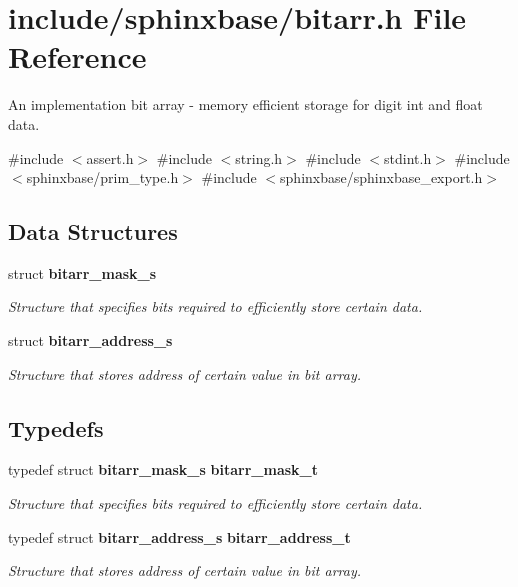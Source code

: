 \section{include/sphinxbase/bitarr.h File Reference}
\label{bitarr_8h}


An implementation bit array -\/ memory efficient storage for digit int and float data.  


{\ttfamily \#include $<$assert.\+h$>$}\newline
{\ttfamily \#include $<$string.\+h$>$}\newline
{\ttfamily \#include $<$stdint.\+h$>$}\newline
{\ttfamily \#include $<$sphinxbase/prim\+\_\+type.\+h$>$}\newline
{\ttfamily \#include $<$sphinxbase/sphinxbase\+\_\+export.\+h$>$}\newline
\subsection*{Data Structures}
\begin{DoxyCompactItemize}
\item 
struct \textbf{ bitarr\+\_\+mask\+\_\+s}
\begin{DoxyCompactList}\small\item\em Structure that specifies bits required to efficiently store certain data. \end{DoxyCompactList}\item 
struct \textbf{ bitarr\+\_\+address\+\_\+s}
\begin{DoxyCompactList}\small\item\em Structure that stores address of certain value in bit array. \end{DoxyCompactList}\end{DoxyCompactItemize}
\subsection*{Typedefs}
\begin{DoxyCompactItemize}
\item 
\mbox{\label{bitarr_8h_abcb7d3674c4b4bbed7af00ddfc07a11f}} 
typedef struct \textbf{ bitarr\+\_\+mask\+\_\+s} \textbf{ bitarr\+\_\+mask\+\_\+t}
\begin{DoxyCompactList}\small\item\em Structure that specifies bits required to efficiently store certain data. \end{DoxyCompactList}\item 
\mbox{\label{bitarr_8h_a0ec20752a791dac325045da770b3510d}} 
typedef struct \textbf{ bitarr\+\_\+address\+\_\+s} \textbf{ bitarr\+\_\+address\+\_\+t}
\begin{DoxyCompactList}\small\item\em Structure that stores address of certain value in bit array. \end{DoxyCompactList}\end{DoxyCompactItemize}
